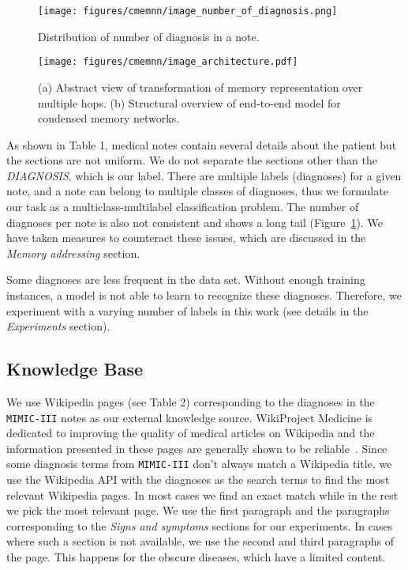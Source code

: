 \begin{figure}
\centering
    \texttt{[image: figures/cmemnn/image\_number\_of\_diagnosis.png]}
  \caption[Distribution of classes]{Distribution of number of diagnosis in a note.}
\label{number_of_diagnosis}
\end{figure}



\begin{figure}
 \centering 
 \texttt{[image: figures/cmemnn/image\_architecture.pdf]}
  \caption[CMemNN Structure]{\small (a) Abstract view of transformation of memory representation over multiple hops. 
  (b) Structural overview of end-to-end model for condensed memory networks.}
\end{figure}

As shown in Table 1, medical notes contain several details about the patient but the sections are not uniform. We do not separate the sections other than the \emph{DIAGNOSIS}, which is our label. There are multiple labels (diagnoses) for a given note, and a note can belong to multiple classes of diagnoses, thus we formulate our task as a multiclass-multilabel classification problem. The number of diagnoses per note is also not consistent and shows a long tail (Figure~\ref{number_of_diagnosis}). We have taken measures to counteract these issues, which are discussed in the \emph{Memory addressing} section. 

Some diagnoses are less frequent in the data set. Without enough training instances, a model is not able to learn to recognize these diagnoses. Therefore, we experiment with a varying number of labels in this work (see details in the \emph{Experiments} section). %

\subsection{Knowledge Base}
We use Wikipedia pages (see Table 2) corresponding to the diagnoses in the \texttt{MIMIC-III} notes as our external knowledge source. WikiProject Medicine is dedicated to improving the quality of medical articles on Wikipedia and the information presented in these pages are generally shown to be reliable~\cite{trevena2011wikiproject}. %
Since some diagnosis terms from \texttt{MIMIC-III} don't always match a Wikipedia title, we use the Wikipedia API with the diagnoses as the search terms to find the most relevant Wikipedia pages. In most cases we find an exact match while in the rest we pick the most relevant page. We use the first paragraph and the paragraphs corresponding to the \emph{Signs and symptoms} sections for our experiments. In cases where such a section is not available, we use the second and third paragraphs of the page. This happens for the obscure diseases, which have a limited content.


